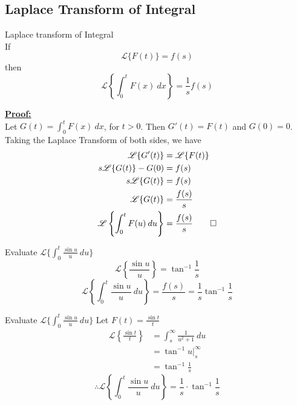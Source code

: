 \documentclass[12pt]{article}
\newcommand{\Lap}{\mathscr{L}}
\begin{document}
\subsection{Laplace Transform of Integral}
\begin{theorem}{Laplace transform of Integral}{}
    \\If \[
        \Lap \{ F(t) \} = f(s)
    \] then \[
        \Lap \left\{ \int_{0}^{t} {F(x)} \: d{x} \right\} = \frac{1}{s} f(s)
    \]
\end{theorem}

\underline{\textbf{Proof: }} \\
Let $G(t) = \displaystyle \int_{0}^{t} {F(x)} \: d{x}$, for $t>0$. Then $G'(t) = F(t)$ and $G(0) = 0$. Taking the Laplace Transform of both sides, we have
\begin{align*}
    \Lap \{ G'(t) \} &= \Lap \{ F(t) \} \\
    s \Lap \{ G(t) \} - G(0) &= f(s) \\
    s \Lap \{ G(t) \} &= f(s) \\
    \Lap \{ G(t) \} &= \frac{f(s)}{s} \\
    \Lap \left\{ \int_{0}^{t} {F(u)} \: d{u} \right\} &= \frac{f(s)}{s} \qed
\end{align*}


\begin{example}{Evaluate $\Lap \{ \int_{0}^{t} {\frac{\sin{u}}{u}} \: d{u} \}$}{}
\[ \Lap \left\{ \frac{\sin{u}}{u} \right\} = \tan^{-1}{\frac{1}{s}} \]
    \[
        \Lap \left\{ \int_{0}^{t} {\frac{\sin{u}}{u}} \: d{u} \right\} = \frac{f(s)}{s} = \frac{1}{s} \tan^{-1}{\frac{1}{s}}
    \]
\end{example}

\begin{example}{Evaluate $\Lap \{ \int_{0}^{t} {\frac{\sin{u}}{u}} \: d{u} \}$}{}
    Let $F(t) = \frac{\sin{t}}{t}$
    \begin{align*}
        \Lap \left\{ \frac{\sin{t}}{t} \right\} &= \int_{s}^{\infty} {\frac{1}{u^2+1}} \: d{u} \\
                                                &= \tan^{-1}{u} \bigg|_s^\infty \\
                                                &= \tan^{-1}{\frac{1}{s}}
    \end{align*}
    \[
        \therefore \Lap \left\{ \int_{0}^{t} {\frac{\sin{u}}{u}} \: d{u} \right\} = \frac{1}{s} \cdot \tan^{-1}{\frac{1}{s}}
    \]

\end{example}
\end{document}
